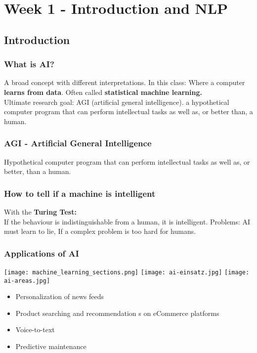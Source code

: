 \section{Week 1 - Introduction and NLP}
\subsection{Introduction}
\subsubsection{What is AI?}
A broad concept with different interpretations.
In this class: Where a computer \textbf{learns from data}.
Often called \textbf{statistical machine learning.}\\
Ultimate research goal: AGI (artificial general intelligence).
a hypothetical computer program that can perform intellectual tasks as well as, or better than, a human.

\subsubsection{AGI - Artificial General Intelligence}
Hypothetical computer program that can perform intellectual tasks as well as, or better, than a human.
\subsubsection{How to tell if a machine is intelligent}
With the \textbf{Turing Test:}\\
If the behaviour is indistinguishable from a human, it is intelligent.
Problems: AI must learn to lie, If a complex problem is too hard for humans.

\subsubsection{Applications of AI}
\texttt{[image: machine\_learning\_sections.png]}
\texttt{[image: ai-einsatz.jpg]}
\texttt{[image: ai-areas.jpg]}
\begin{itemize}
    \item Personalization of news feeds
    \item Product searching and recommendation s on eCommerce platforms
    \item Voice-to-text
    \item Predictive maintenance
\end{itemize}

